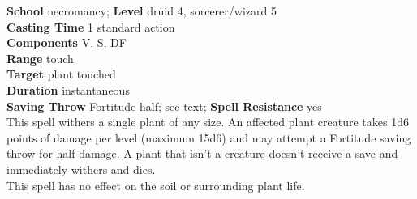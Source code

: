 \textbf{School} necromancy; \textbf{Level} druid 4, sorcerer/wizard 5\\
\textbf{Casting Time} 1 standard action\\
\textbf{Components} V, S, DF\\
\textbf{Range} touch\\
\textbf{Target} plant touched\\
\textbf{Duration} instantaneous\\
\textbf{Saving Throw} Fortitude half; see text; \textbf{Spell Resistance} yes\\
This spell withers a single plant of any size. An affected plant creature takes 1d6 points of damage per level (maximum 15d6) and may attempt a Fortitude saving throw for half damage. A plant that isn't a creature doesn't receive a save and immediately withers and dies.\\
This spell has no effect on the soil or surrounding plant life.\\
